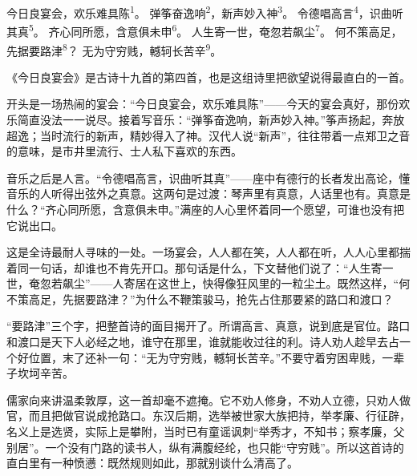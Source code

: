 
\begin{poem}
今日良宴会，欢乐难具陈\textsuperscript{1}。
弹筝奋逸响\textsuperscript{2}，新声妙入神\textsuperscript{3}。
令德唱高言\textsuperscript{4}，识曲听其真\textsuperscript{5}。
齐心同所愿，含意俱未申\textsuperscript{6}。
人生寄一世，奄忽若飙尘\textsuperscript{7}。
何不策高足，先据要路津\textsuperscript{8}？
无为守穷贱，轗轲长苦辛\textsuperscript{9}。
\end{poem}

\begin{annotations}
\end{annotations}

\begin{appreciation}
《今日良宴会》是古诗十九首的第四首，也是这组诗里把欲望说得最直白的一首。

开头是一场热闹的宴会：“今日良宴会，欢乐难具陈”——今天的宴会真好，那份欢乐简直没法一一说尽。接着写音乐：“弹筝奋逸响，新声妙入神。”筝声扬起，奔放超逸；当时流行的新声，精妙得入了神。汉代人说“新声”，往往带着一点郑卫之音的意味，是市井里流行、士人私下喜欢的东西。

音乐之后是人言。“令德唱高言，识曲听其真”——座中有德行的长者发出高论，懂音乐的人听得出弦外之真意。这两句是过渡：琴声里有真意，人话里也有。真意是什么？“齐心同所愿，含意俱未申。”满座的人心里怀着同一个愿望，可谁也没有把它说出口。

这是全诗最耐人寻味的一处。一场宴会，人人都在笑，人人都在听，人人心里都揣着同一句话，却谁也不肯先开口。那句话是什么，下文替他们说了：“人生寄一世，奄忽若飙尘”——人寄居在这世上，快得像狂风里的一粒尘土。既然这样，“何不策高足，先据要路津？”为什么不鞭策骏马，抢先占住那要紧的路口和渡口？

“要路津”三个字，把整首诗的面目揭开了。所谓高言、真意，说到底是官位。路口和渡口是天下人必经之地，谁守在那里，谁就能收过往的利。诗人劝人趁早去占一个好位置，末了还补一句：“无为守穷贱，轗轲长苦辛。”不要守着穷困卑贱，一辈子坎坷辛苦。

儒家向来讲温柔敦厚，这一首却毫不遮掩。它不劝人修身，不劝人立德，只劝人做官，而且把做官说成抢路口。东汉后期，选举被世家大族把持，举孝廉、行征辟，名义上是选贤，实际上是攀附，当时已有童谣讽刺“举秀才，不知书；察孝廉，父别居”。一个没有门路的读书人，纵有满腹经纶，也只能“守穷贱”。所以这首诗的直白里有一种愤懑：既然规则如此，那就别谈什么清高了。
\end{appreciation}
